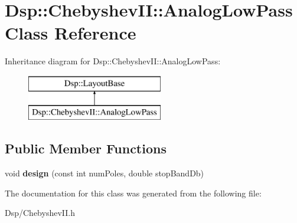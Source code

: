 \hypertarget{classDsp_1_1ChebyshevII_1_1AnalogLowPass}{\section{Dsp\-:\-:Chebyshev\-I\-I\-:\-:Analog\-Low\-Pass Class Reference}
\label{classDsp_1_1ChebyshevII_1_1AnalogLowPass}
}
Inheritance diagram for Dsp\-:\-:Chebyshev\-I\-I\-:\-:Analog\-Low\-Pass\-:\begin{figure}[H]
\begin{center}
\leavevmode
\includegraphics[height=2.000000cm]{classDsp_1_1ChebyshevII_1_1AnalogLowPass}
\end{center}
\end{figure}
\subsection*{Public Member Functions}
\begin{DoxyCompactItemize}
\item 
\hypertarget{classDsp_1_1ChebyshevII_1_1AnalogLowPass_a441350ba145c4fcf37d424549a96a9a6}{void {\bfseries design} (const int num\-Poles, double stop\-Band\-Db)}\label{classDsp_1_1ChebyshevII_1_1AnalogLowPass_a441350ba145c4fcf37d424549a96a9a6}

\end{DoxyCompactItemize}


The documentation for this class was generated from the following file\-:\begin{DoxyCompactItemize}
\item 
Dsp/Chebyshev\-I\-I.\-h\end{DoxyCompactItemize}
